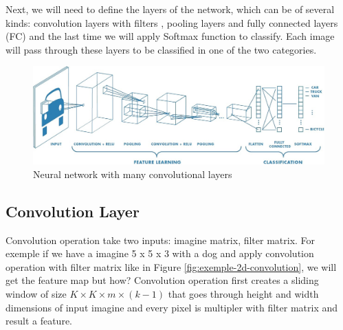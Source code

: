 Next, we will need to define the layers of the network, 
which can be of several kinds: convolution layers with filters , pooling layers and fully connected layers (FC)
and the last time we will apply Softmax function to classify.
 Each image will pass through these layers to be classified in one of the two categories.


 \begin{figure}[htbp]
  \centerline{\includegraphics[scale=0.35]{fig/cnn.jpeg}}  
  \caption{Neural network with many convolutional layers \cite{cnn-mathworks}}
  \label{fig:cnn-arhitecture}
\end{figure}



\subsection{Convolution Layer}

Convolution operation take two inputs: imagine matrix, filter matrix.  
For exemple if we have a imagine 5 x 5 x 3 with a dog and apply convolution operation with filter matrix like in Figure \ref{fig:exemple-2d-convolution},  we will get the feature map but how?
Convolution operation first creates a sliding window of size $K \times K \times m \times (k-1)$ that goes through height and width dimensions of input imagine 
and every pixel is multipler with filter matrix and result a feature. \cite{Mallat:2008:WTS:1525499}

